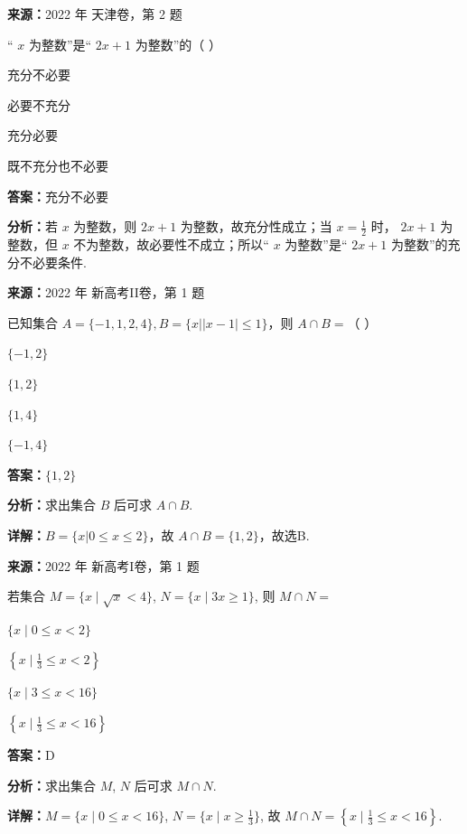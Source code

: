 \begin{question}[points=5]
\textbf{来源：}2022 年 天津卷，第 2 题\par
“ $x$ 为整数”是“ $2x+1$ 为整数”的（   ）
\begin{choices}
  \item 充分不必要
  \item 必要不充分
  \item 充分必要
  \item 既不充分也不必要
\end{choices}
\begin{solution}
\textbf{答案：}充分不必要

\textbf{分析：}若 $x$ 为整数，则 $2x+1$ 为整数，故充分性成立；当 $x=\frac{1}{2}$ 时， $2x+1$ 为整数，但 $x$ 不为整数，故必要性不成立；所以“ $x$ 为整数”是“ $2x+1$ 为整数”的充分不必要条件.
\end{solution}
\end{question}

\begin{question}[points=5]
\textbf{来源：}2022 年 新高考II卷，第 1 题\par
已知集合 $A=\{-1,1,2,4\}, B=\{x||x-1|\leq 1\}$，则 $A\cap B=$（ ）
\begin{choices}
  \item $\{-1,2\}$
  \item $\{1,2\}$
  \item $\{1,4\}$
  \item $\{-1,4\}$
\end{choices}
\begin{solution}
\textbf{答案：}$\{1,2\}$

\textbf{分析：}求出集合 $B$ 后可求 $A\cap B$.

\textbf{详解：}$B=\{x|0\leq x\leq 2\}$，故 $A\cap B=\{1,2\}$，故选B.
\end{solution}
\end{question}

\begin{question}[points=5]
\textbf{来源：}2022 年 新高考I卷，第 1 题\par
若集合 $M = \{x\mid \sqrt{x} < 4\}$, $N = \{x\mid 3x \ge 1\}$, 则 $M \cap N =$
\begin{choices}
  \item $\{x\mid 0 \le x < 2\}$
  \item $\left\{x \mid \frac{1}{3} \le x < 2\right\}$
  \item $\{x\mid 3 \le x < 16\}$
  \item $\left\{x \mid \frac{1}{3} \le x < 16\right\}$
\end{choices}
\begin{solution}
\textbf{答案：}D

\textbf{分析：}求出集合 $M$, $N$ 后可求 $M \cap N$.

\textbf{详解：}$M = \{x\mid 0 \le x < 16\}$, $N = \{x\mid x \ge \frac{1}{3}\}$, 故 $M \cap N = \left\{x \mid \frac{1}{3} \le x < 16\right\}$.
\end{solution}
\end{question}

